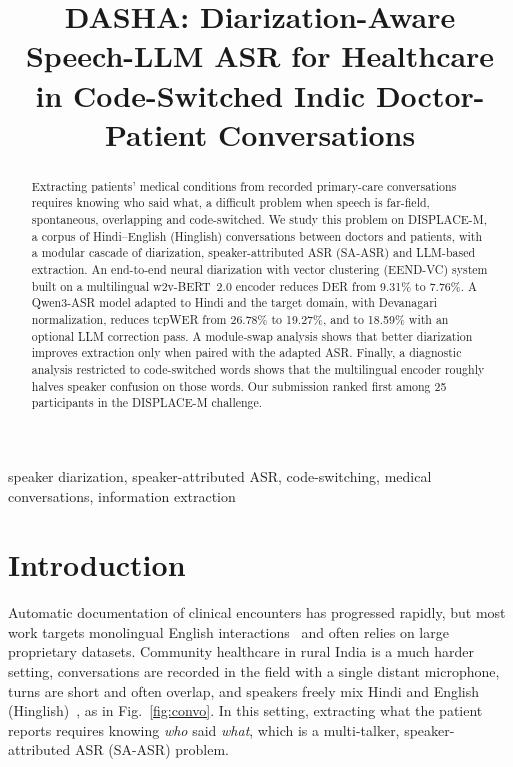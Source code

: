 \documentclass{article}
\title{DASHA: Diarization-Aware Speech-LLM ASR for Healthcare in Code-Switched Indic Doctor-Patient Conversations}
\begin{document}
\ninept
\renewcommand{\baselinestretch}{0.92}\selectfont
\maketitle

\begin{abstract}
Extracting patients' medical conditions from recorded primary-care conversations requires knowing who said what, a difficult problem when speech is far-field, spontaneous, overlapping and code-switched.
We study this problem on DISPLACE-M, a corpus of Hindi--English (Hinglish) conversations between doctors and patients, with a modular cascade of diarization, speaker-attributed ASR (SA-ASR) and LLM-based extraction.
An end-to-end neural diarization with vector clustering (EEND-VC) system built on a multilingual w2v-BERT~2.0 encoder reduces DER from 9.31\% to 7.76\%.
A Qwen3-ASR model adapted to Hindi and the target domain, with Devanagari normalization, reduces tcpWER from 26.78\% to 19.27\%, and to 18.59\% with an optional LLM correction pass.
A module-swap analysis shows that better diarization improves extraction only when paired with the adapted ASR.
Finally, a diagnostic analysis restricted to code-switched words shows that the multilingual encoder roughly halves speaker confusion on those words.
Our submission ranked first among 25 participants in the DISPLACE-M challenge.
\end{abstract}

\begin{keywords}
speaker diarization, speaker-attributed ASR, code-switching, medical conversations, information extraction
\end{keywords}

\section{Introduction}
\label{sec:intro}

Automatic documentation of clinical encounters has progressed rapidly, but most work targets monolingual English interactions~\cite{chiu18_interspeech, giorgi-etal-2023-wanglab} and often relies on large proprietary datasets.
Community healthcare in rural India is a much harder setting, conversations are recorded in the field with a single distant microphone, turns are short and often overlap, and speakers freely mix Hindi and English (Hinglish)~\cite{dey-fung-2014-hindi}, as in Fig.~\ref{fig:convo}.
In this setting, extracting what the patient reports requires knowing \emph{who} said \emph{what}, which is a multi-talker, speaker-attributed ASR (SA-ASR) problem.
\end{document}

